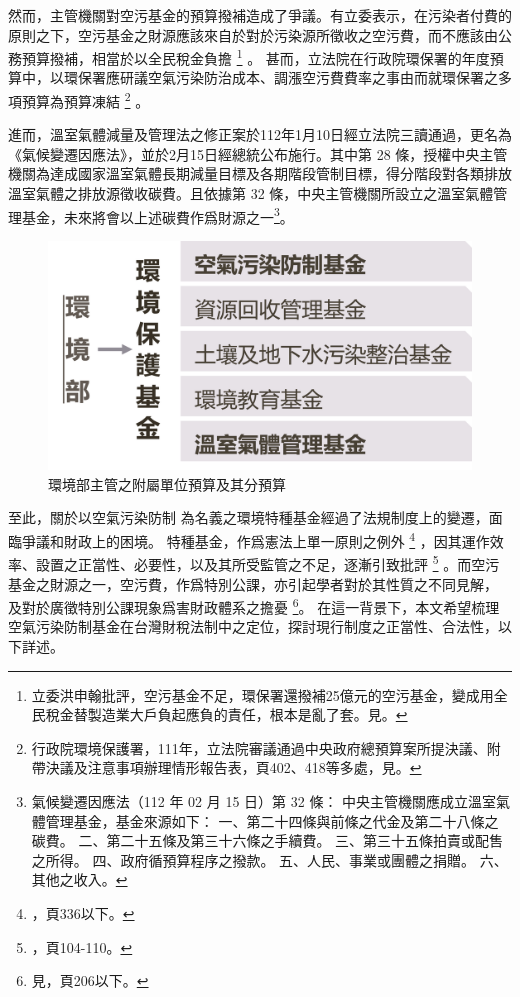 \documentclass[12pt,a4paper]{article}
\begin{document}
然而，主管機關對空污基金的預算撥補造成了爭議。有立委表示，在污染者付費的原則之下，空污基金之財源應該來自於對於污染源所徵收之空污費，而不應該由公務預算撥補，相當於以全民稅金負擔
\footnote{立委洪申翰批評，空污基金不足，環保署還撥補25億元的空污基金，變成用全民稅金替製造業大戶負起應負的責任，根本是亂了套。見。}
。
甚而，立法院在行政院環保署的年度預算中，以環保署應研議空氣污染防治成本、調漲空污費費率之事由而就環保署之多項預算為預算凍結
\footnote{行政院環境保護署，111年，立法院審議通過中央政府總預算案所提決議、附帶決議及注意事項辦理情形報告表，頁402、418等多處，見。}
。




  

進而，溫室氣體減量及管理法之修正案於112年1月10日經立法院三讀通過，更名為《氣候變遷因應法》，並於2月15日經總統公布施行。其中第 28 條，授權中央主管機關為達成國家溫室氣體長期減量目標及各期階段管制目標，得分階段對各類排放溫室氣體之排放源徵收碳費。且依據第 32 條，中央主管機關所設立之溫室氣體管理基金，未來將會以上述碳費作爲財源之一\footnote{氣候變遷因應法（112 年 02 月 15 日）第 32 條：
中央主管機關應成立溫室氣體管理基金，基金來源如下：
一、第二十四條與前條之代金及第二十八條之碳費。
二、第二十五條及第三十六條之手續費。
三、第三十五條拍賣或配售之所得。
四、政府循預算程序之撥款。
五、人民、事業或團體之捐贈。
六、其他之收入。}。


\begin{figure}[h]
  \centering
  \includegraphics[width=0.6\linewidth]{img/structure2bw.png}
  \caption[現環境部主管之附屬單位預算及其分預算]{環境部主管之附屬單位預算及其分預算 \footnotemark }
  \label{fig:structure}
\end{figure}




至此，關於以空氣污染防制
為名義之環境特種基金經過了法規制度上的變遷，面臨爭議和財政上的困境。
特種基金，作爲憲法上單一原則之例外
\footnote{，頁336以下。}
，因其運作效率、設置之正當性、必要性，以及其所受監管之不足，逐漸引致批評
\footnote{，頁104-110。}
。而空污基金之財源之一，空污費，作爲特別公課，亦引起學者對於其性質之不同見解，
及對於廣徵特別公課現象爲害財政體系之擔憂
\footnote{見，頁206以下。}。
在這一背景下，本文希望梳理空氣污染防制基金在台灣財稅法制中之定位，探討現行制度之正當性、合法性，以下詳述。
\end{document}
